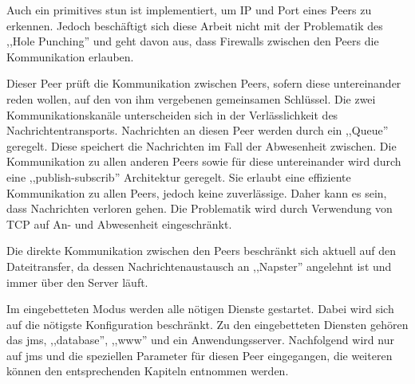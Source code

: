 \documentclass[oneside, ngerman, toc=bibliography,bibliography=totoc,listof=entryprefix, open=right,numbers=noenddot,fontsize=12pt]{scrbook}
\begin{document}
Auch ein primitives \acrshort{stun} ist implementiert, um IP und Port eines Peers zu erkennen. Jedoch beschäftigt sich diese Arbeit nicht mit der Problematik des ,,Hole Punching'' und geht davon aus, dass Firewalls zwischen den Peers die Kommunikation erlauben.


Dieser Peer prüft die Kommunikation zwischen Peers, sofern diese untereinander reden wollen, auf den von ihm vergebenen gemeinsamen Schlüssel.
Die zwei Kommunikationskanäle unterscheiden sich in der Verlässlichkeit des Nachrichtentransports. Nachrichten an diesen Peer werden durch ein ,,Queue'' geregelt. Diese speichert die Nachrichten im Fall der Abwesenheit zwischen. Die Kommunikation zu allen anderen Peers sowie für diese untereinander wird durch eine ,,publish-subscrib'' Architektur geregelt. Sie erlaubt eine effiziente Kommunikation zu allen Peers, jedoch keine zuverlässige. Daher kann es sein, dass Nachrichten verloren gehen. Die Problematik wird durch Verwendung von TCP auf An- und Abwesenheit eingeschränkt. 

Die direkte Kommunikation zwischen den Peers beschränkt sich aktuell auf den Dateitransfer, da dessen Nachrichtenaustausch an ,,Napster'' angelehnt ist und immer über den Server läuft.


Im eingebetteten Modus werden alle nötigen Dienste gestartet. Dabei wird sich auf die nötigste Konfiguration beschränkt. Zu den eingebetteten Diensten gehören das \acrshort{jms}, ,,database'', ,,www'' und ein Anwendungsserver. Nachfolgend wird nur auf \acrshort{jms} und die speziellen Parameter für diesen Peer eingegangen, die weiteren können den entsprechenden Kapiteln entnommen werden.
\end{document}
